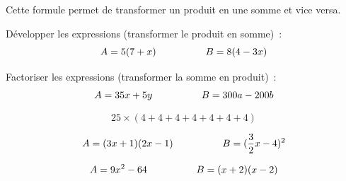 \documentclass{thecours}
\begin{document}
\par{}
Cette formule permet de transformer un produit en une somme et vice versa.\vskip10pt
\par{}
Développer les expressions (transformer le produit en somme)~:
$$A=5(7+x)\hskip50ptB=8(4-3x)$$
\par{}
Factoriser les expressions (transformer la somme en produit)~:
$$A=35x+5y\hskip50ptB=300a-200b$$
\par{}
$$25\times(4+4+4+4+4+4+4)$$


\par{}
$$A=(3x+1)(2x-1)\hskip50ptB=(\dfrac{3}{2}x-4)^2$$
\newpage
{}
\par{}
$$A=9x^2-64\hskip50ptB=(x+2)(x-2)$$
\end{document}
